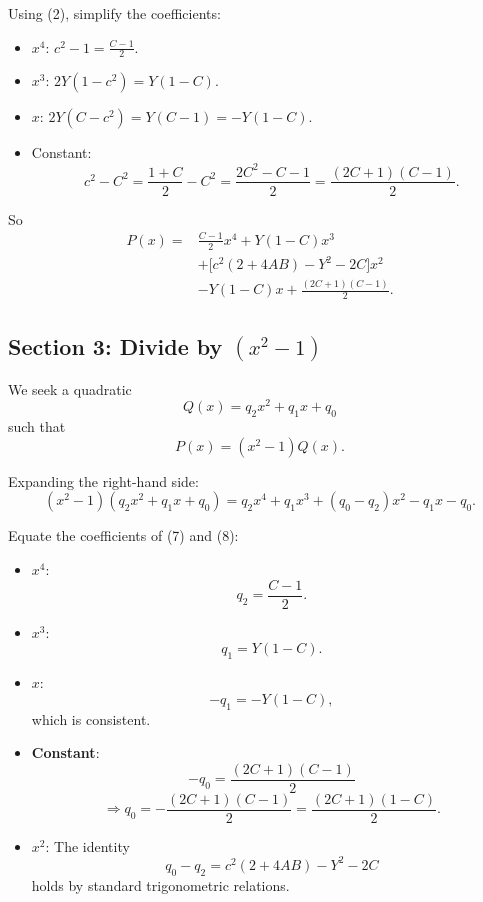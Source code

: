 \documentclass{article}
\begin{document}
Using (2), simplify the coefficients:

\begin{itemize}
\item \(x^{4}\): \(\displaystyle c^{2}-1=\frac{C-1}{2}\).
\item \(x^{3}\): \(\displaystyle 2Y(1-c^{2})=Y(1-C)\).
\item \(x\): \(\displaystyle 2Y(C-c^{2})=Y(C-1)=-Y(1-C)\).
\item Constant:
\[
c^{2}-C^{2}
=\frac{1+C}{2}-C^{2}
=\frac{2C^{2}-C-1}{2}
=\frac{(2C+1)(C-1)}{2}.
\]
\end{itemize}

So
\begin{equation}
\begin{aligned}
P(x)={}&\frac{C-1}{2}x^{4}
+Y(1-C)x^{3} \\
&+\bigl[c^{2}(2+4AB)-Y^{2}-2C\bigr]x^{2} \\
&-Y(1-C)x+\frac{(2C+1)(C-1)}{2}.
\end{aligned}
\tag{7}
\end{equation}

\subsection*{Section 3: Divide by \((x^{2}-1)\)}

We seek a quadratic
\[
Q(x)=q_{2}x^{2}+q_{1}x+q_{0}
\]
such that
\[
P(x)=(x^{2}-1)Q(x).
\]

Expanding the right-hand side:
\begin{equation}
(x^{2}-1)(q_{2}x^{2}+q_{1}x+q_{0})
= q_{2}x^{4}+q_{1}x^{3}+(q_{0}-q_{2})x^{2}-q_{1}x-q_{0}.
\tag{8}
\end{equation}

Equate the coefficients of (7) and (8):

\begin{itemize}
\item \textbf{\(x^{4}\)}:
\[
q_{2}=\frac{C-1}{2}.
\]

\item \textbf{\(x^{3}\)}:
\[
q_{1}=Y(1-C).
\]

\item \textbf{\(x\)}:
\[
-q_{1}=-Y(1-C),
\]
which is consistent.

\item \textbf{Constant}:
\[
-q_{0}=\frac{(2C+1)(C-1)}{2}
\]
\[
\Longrightarrow
q_{0}
=
-\frac{(2C+1)(C-1)}{2}
=
\frac{(2C+1)(1-C)}{2}.
\]

\item \textbf{\(x^{2}\)}: The identity
\[
q_{0}-q_{2}
=
c^{2}(2+4AB)-Y^{2}-2C
\]
holds by standard trigonometric relations.
\end{itemize}
\end{document}
